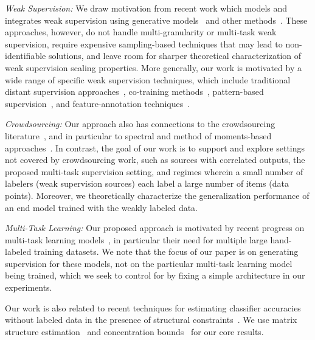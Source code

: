 \documentclass[letterpaper]{article}
\begin{document}
\textit{Weak Supervision:}
We draw motivation from recent work which models and integrates weak supervision using generative models~\cite{ratner2016data,ratner2018snorkel,bach2017learning} and other methods~\cite{guan2017said,khetan2017learning}.
These approaches, however, do not handle multi-granularity or multi-task weak supervision, require expensive sampling-based techniques that may lead to non-identifiable solutions, and leave room for sharper theoretical characterization of weak supervision scaling properties. 
More generally, our work is motivated by a wide range of specific weak supervision techniques, which include traditional distant supervision approaches~\cite{mintz2009distant,craven:ismb99,zhang:cacm17,hoffmann:acl11,takamatsu:acl12}, co-training methods~\cite{blum1998combining}, pattern-based supervision~\cite{gupta2014improved,zhang:cacm17}, and feature-annotation techniques~\cite{mann2010generalized,zaidan:emnlp08,liang:icml09}.

\textit{Crowdsourcing:}
Our approach also has connections to the crowdsourcing literature~\cite{karger2011iterative,dawid1979maximum}, and in particular to spectral and method of moments-based approaches~\cite{zhang2014spectral,dalvi:www13,Ghosh:2011:MMC:1993574.1993599,anandkumar2014tensor}.
In contrast, the goal of our work is to support and explore settings not covered by crowdsourcing work, such as sources with correlated outputs, the proposed multi-task supervision setting, and regimes wherein a small number of labelers (weak supervision sources) each label a large number of items (data points).
Moreover, we theoretically characterize the generalization performance of an end model trained with the weakly labeled data.

\textit{Multi-Task Learning:}
Our proposed approach is motivated by recent progress on multi-task learning models~\cite{Caruana93multitasklearning,DBLP:journals/corr/Ruder17a,sogaard2016deep}, in particular their need for multiple large hand-labeled training datasets.
We note that the focus of our paper is on generating supervision for these models, not on the particular multi-task learning model being trained, which we seek to control for by fixing a simple architecture in our experiments.

Our work is also related to recent techniques for estimating classifier accuracies without labeled data in the presence of structural constraints~\cite{platanios2017estimating}.
We use matrix structure estimation~\cite{loh2012structure} and concentration bounds~\cite{tropp2015introduction} for our core results. 
\end{document}
